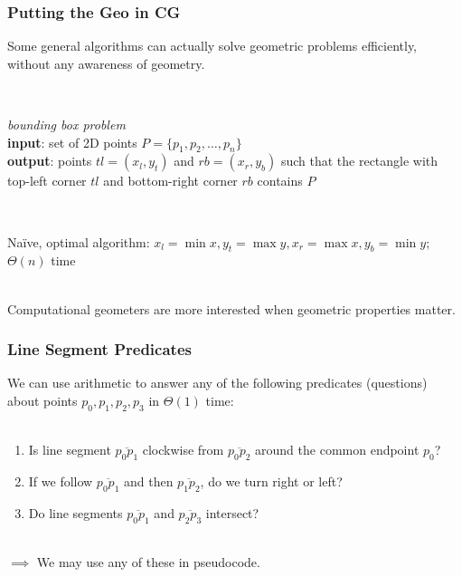 \documentclass{beamer}
\newcommand{\stanza}{ \\~\ }
\begin{document}
\begin{frame} \frametitle{Putting the Geo in CG}
Some general algorithms can actually solve geometric problems efficiently, without
any awareness of geometry. \stanza

\begin{columns}
  \begin{column}{0.7 \textwidth}
  \emph{bounding box problem} \\
  \textbf{input}: set of 2D points $P=\{p_1, p_2, \ldots, p_n\}$ \\
  \textbf{output}: points $tl=(x_l, y_t)$ and $rb=(x_r, y_b)$ such that the rectangle
  with top-left corner $tl$ and bottom-right corner $rb$ contains $P$ \stanza
  \end{column}
  \begin{column}{0.3 \textwidth}
    \begin{center}
    \end{center}
  \end{column}
\end{columns}

Na\"{i}ve, optimal algorithm:
$x_l = \min x, y_t = \max y, x_r = \max x, y_b = \min y$;
$\Theta(n)$ time \stanza

Computational geometers are more interested when geometric properties matter.
\end{frame}

\begin{frame} \frametitle{Line Segment Predicates}
We can use arithmetic to answer any of the following predicates (questions)
about points $p_0, p_1, p_2, p_3$ in $\Theta(1)$ time: \stanza
\begin{enumerate}
  \item Is line segment $\overline{p_0 p_1}$ clockwise from $\overline{p_0 p_2}$
    around the common endpoint $p_0$?
  \item If we follow $\overline{p_0 p_1}$ and then $\overline{p_1 p_2}$, do we
    turn right or left?
  \item Do line segments $\overline{p_0 p_1}$ and $\overline{p_2 p_3}$
    intersect? \stanza
\end{enumerate}

$\implies$ We may use any of these in pseudocode.
\end{frame}
\end{document}
